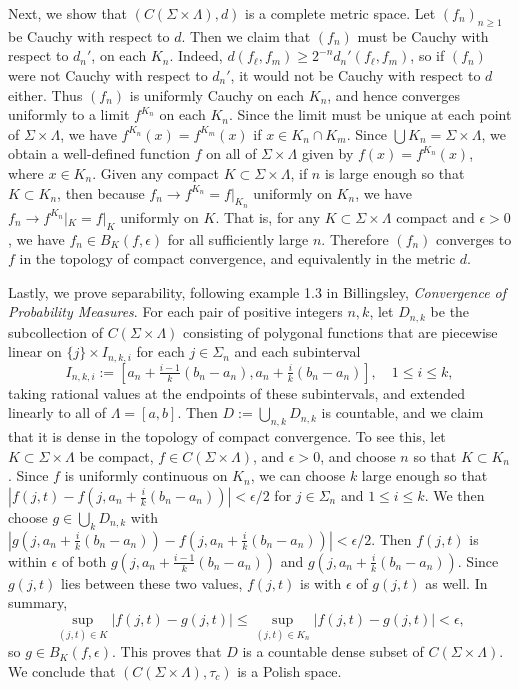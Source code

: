 \documentclass[12pt]{article}
\begin{document}
		Next, we show that $(C(\Sigma\times\Lambda), d)$ is a complete metric space. Let $(f_n)_{n\geq 1}$ be Cauchy with respect to $d$. Then we claim that $(f_n)$ must be Cauchy with respect to $d_n'$, on each $K_n$. Indeed, $d(f_\ell, f_m) \geq 2^{-n}d_n'(f_\ell, f_m)$, so if $(f_n)$ were not Cauchy with respect to $d_n'$, it would not be Cauchy with respect to $d$ either. Thus $(f_n)$ is uniformly Cauchy on each $K_n$, and hence converges uniformly to a limit $f^{K_n}$ on each $K_n$. Since the limit must be unique at each point of $\Sigma\times\Lambda$, we have $f^{K_n}(x) = f^{K_m}(x)$ if $x\in K_n\cap K_m$. Since $\bigcup K_n = \Sigma\times\Lambda$, we obtain a well-defined function $f$ on all of $\Sigma\times\Lambda$ given by $f(x)=f^{K_n}(x)$, where $x\in K_n$. Given any compact $K\subset \Sigma\times\Lambda$, if $n$ is large enough so that $K\subset K_n$, then because $f_n \to f^{K_n} = f|_{K_n}$ uniformly on $K_n$, we have $f_n \to f^{K_n}|_K = f|_K$ uniformly on $K$. That is, for any $K\subset\Sigma\times\Lambda$ compact and $\epsilon>0$, we have $f_n \in B_K(f,\epsilon)$ for all sufficiently large $n$. Therefore $(f_n)$ converges to $f$ in the topology of compact convergence, and equivalently in the metric $d$.
		
		Lastly, we prove separability, following example 1.3 in Billingsley, \textit{Convergence of Probability Measures}. For each pair of positive integers $n,k$, let $D_{n,k}$ be the subcollection of $C(\Sigma\times\Lambda)$ consisting of polygonal functions that are piecewise linear on $\{j\}\times I_{n,k,i}$ for each $j\in\Sigma_n$ and each subinterval 
		\[
		I_{n,k,i} := [a_n+\tfrac{i-1}{k}(b_n-a_n), a_n+\tfrac{i}{k}(b_n-a_n)], \quad 1\leq i\leq k,
		\] 
		taking rational values at the endpoints of these subintervals, and extended linearly to all of $\Lambda = [a,b]$. Then $D := \bigcup_{n,k} D_{n,k}$ is countable, and we claim that it is dense in the topology of compact convergence. To see this, let $K\subset\Sigma\times\Lambda$ be compact, $f\in C(\Sigma\times\Lambda)$, and $\epsilon>0$, and choose $n$ so that $K\subset K_n$. Since $f$ is uniformly continuous on $K_n$, we can choose $k$ large enough so that $|f(j,t) - f(j, a_n + \frac{i}{k}(b_n-a_n))| < \epsilon/2$ for $j\in\Sigma_n$ and $1\leq i\leq k$. We then choose $g\in \bigcup_k D_{n,k}$ with $|g(j,a_n + \frac{i}{k}(b_n-a_n)) - f(j,a_n + \frac{i}{k}(b_n-a_n))| < \epsilon/2$. Then $f(j,t)$ is within $\epsilon$ of both $g(j,a_n + \frac{i-1}{k}(b_n-a_n))$ and $g(j,a_n + \frac{i}{k}(b_n-a_n))$. Since $g(j,t)$ lies between these two values, $f(j,t)$ is with $\epsilon$ of $g(j,t)$ as well. In summary,
		\[
		\sup_{(j,t)\in K} |f(j,t)-g(j,t)| \leq \sup_{(j,t)\in K_n} |f(j,t)-g(j,t)| < \epsilon,
		\] 
		so $g\in B_K(f,\epsilon)$. This proves that $D$ is a countable dense subset of $C(\Sigma\times\Lambda)$. We conclude that $(C(\Sigma\times\Lambda),\tau_c)$ is a Polish space.
		
\end{document}
